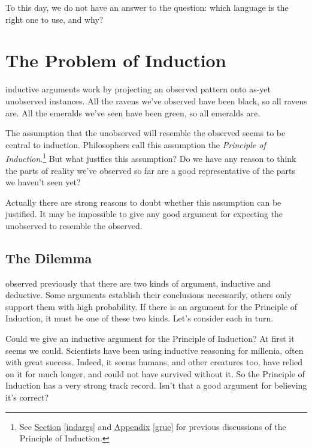 \documentclass[justified]{tufte-book}
\theoremstyle{definition}
\theoremstyle{definition}
\theoremstyle{definition}
\theoremstyle{remark}
\begin{document}
To this day, we do not have an answer to the question: which language is
the right one to use, and why?

\hypertarget{the-problem-of-induction}{%
\chapter{The Problem of Induction}\label{the-problem-of-induction}}

 inductive arguments work by projecting an observed
pattern onto as-yet unobserved instances. All the ravens we've observed
have been black, so all ravens are. All the emeralds we've seen have
been green, so all emeralds are.

The assumption that the unobserved will resemble the observed seems to
be central to induction. Philosophers call this assumption the
\emph{Principle of Induction}.\footnote{See
  \protect\hyperlink{indargs}{Section} \ref{indargs} and
  \protect\hyperlink{grue}{Appendix} \ref{grue} for previous discussions
  of the Principle of Induction.} But what justfies this assumption? Do
we have any reason to think the parts of reality we've observed so far
are a good representative of the parts we haven't seen yet?

Actually there are strong reasons to doubt whether this assumption can
be justified. It may be impossible to give any good argument for
expecting the unobserved to resemble the observed.

\hypertarget{the-dilemma}{%
\section*{The Dilemma}\label{the-dilemma}}

 observed previously that there are two kinds of
argument, inductive and deductive. Some arguments establish their
conclusions necessarily, others only support them with high probability.
If there is an argument for the Principle of Induction, it must be one
of these two kinds. Let's consider each in turn.

Could we give an inductive argument for the Principle of Induction? At
first it seems we could. Scientists have been using inductive reasoning
for millenia, often with great success. Indeed, it seems humans, and
other creatures too, have relied on it for much longer, and could not
have survived without it. So the Principle of Induction has a very
strong track record. Isn't that a good argument for believing it's
correct?
\end{document}
